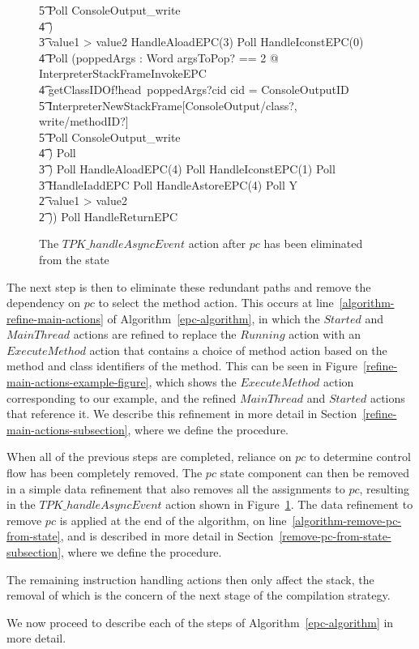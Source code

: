 \begin{figure}
{\begin{circus}
    \t5 Poll \circseq ConsoleOutput\_write \\
    \t4 \circfi) \\
    \t3 {} \circelse value1 > value2 \circthen HandleAloadEPC(3) \circseq Poll \circseq HandleIconstEPC(0) \circseq \\
    \t4 Poll \circseq (\circvar poppedArgs : Word \circspot \lschexpract \exists argsToPop? == 2 @ InterpreterStackFrameInvokeEPC \rschexpract \circseq \\
    \t4 getClassIDOf!head~poppedArgs?cid \then \circif cid = ConsoleOutputID \circthen {} \\
    \t5 \lschexpract InterpreterNewStackFrame[ConsoleOutput/class?, write/methodID?] \rschexpract \circseq \\
    \t5 Poll \circseq ConsoleOutput\_write \\
    \t4 \circfi) \circseq Poll \\
    \t3 \circfi) \circseq Poll \circseq HandleAloadEPC(4) \circseq Poll \circseq HandleIconstEPC(1) \circseq Poll \circseq \\
    \t3 HandleIaddEPC \circseq Poll \circseq HandleAstoreEPC(4) \circseq Poll \circseq Y \\
    \t2 {} \circelse value1 > value2 \circthen \Skip \\
    \t2 \circfi)) \circseq Poll \circseq HandleReturnEPC
  \end{circus}
  }
  \caption{The $TPK\_handleAsyncEvent$ action after $pc$ has been eliminated from the state}
  \label{pc-elimination-HandleAsyncEvent-example-figure}
\end{figure}

The next step is then to eliminate these redundant paths and remove
the dependency on $pc$ to select the method action.
This occurs at line~\ref{algorithm-refine-main-actions} of
Algorithm~\ref{epc-algorithm}, in which the $Started$ and $MainThread$
actions are refined to replace the $Running$ action with an
$ExecuteMethod$ action that contains a choice of method action based
on the method and class identifiers of the method.
This can be seen in Figure~\ref{refine-main-actions-example-figure},
which shows the $ExecuteMethod$ action corresponding to our example,
and the refined $MainThread$ and $Started$ actions that reference it.
We describe this refinement in more detail in
Section~\ref{refine-main-actions-subsection}, where we define the
 procedure.

When all of the previous steps are completed, reliance on $pc$ to
determine control flow has been completely removed.
The $pc$ state component can then be removed in a simple data
refinement that also removes all the assignments to $pc$, resulting in
the $TPK\_handleAsyncEvent$ action shown in
Figure~\ref{pc-elimination-HandleAsyncEvent-example-figure}.
The data refinement to remove $pc$ is applied at the end of the
algorithm, on line~\ref{algorithm-remove-pc-from-state}, and is
described in more detail in
Section~\ref{remove-pc-from-state-subsection}, where we define the
 procedure.

The remaining instruction handling actions then only affect the stack,
the removal of which is the concern of the next stage of the
compilation strategy.

We now proceed to describe each of the steps of
Algorithm~\ref{epc-algorithm} in more detail.
